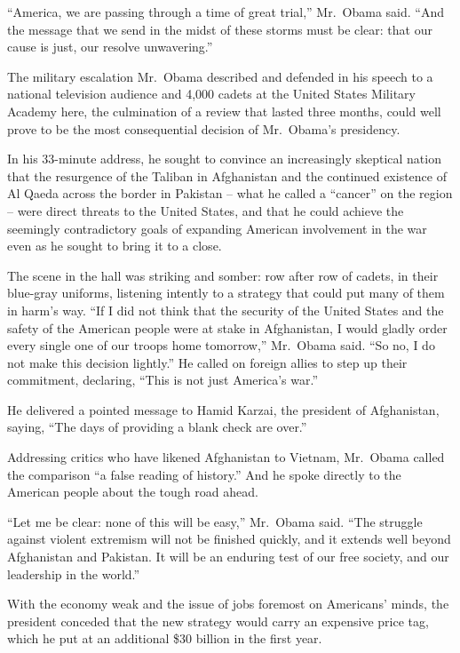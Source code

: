 ﻿\documentclass[12pt]{article}
\begin{document}
``America, we are passing through a time of great trial,'' Mr.~Obama said. ``And the message that we
send in the midst of these storms must be clear: that our cause is just, our resolve unwavering.''

The military escalation Mr.~Obama described and defended in his speech to a national television
audience and 4,000 cadets at the United States Military Academy here, the culmination of a review
that lasted three months, could well prove to be the most consequential decision of Mr.~Obama's
presidency.

In his 33-minute address, he sought to convince an increasingly skeptical nation that the resurgence
of the Taliban in Afghanistan and the continued existence of Al Qaeda across the border in Pakistan
-- what he called a ``cancer'' on the region -- were direct threats to the United States, and that
he could achieve the seemingly contradictory goals of expanding American involvement in the war even
as he sought to bring it to a close.

The scene in the hall was striking and somber: row after row of cadets, in their blue-gray uniforms,
listening intently to a strategy that could put many of them in harm's way. ``If I did not think
that the security of the United States and the safety of the American people were at stake in
Afghanistan, I would gladly order every single one of our troops home tomorrow,'' Mr.~Obama said.
``So no, I do not make this decision lightly.'' He called on foreign allies to step up their
commitment, declaring, ``This is not just America's war.''

He delivered a pointed message to Hamid Karzai, the president of Afghanistan, saying, ``The days of
providing a blank check are over.''

Addressing critics who have likened Afghanistan to Vietnam, Mr.~Obama called the comparison ``a
false reading of history.'' And he spoke directly to the American people about the tough road ahead.

``Let me be clear: none of this will be easy,'' Mr.~Obama said. ``The struggle against violent
extremism will not be finished quickly, and it extends well beyond Afghanistan and Pakistan. It will
be an enduring test of our free society, and our leadership in the world.''

With the economy weak and the issue of jobs foremost on Americans' minds, the president conceded
that the new strategy would carry an expensive price tag, which he put at an additional \$30 billion
in the first year.
\end{document}
